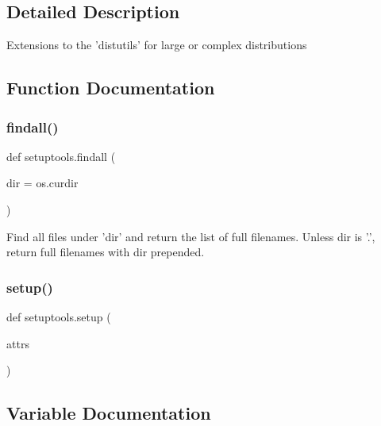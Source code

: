 \subsection{Detailed Description}
\begin{DoxyVerb}Extensions to the 'distutils' for large or complex distributions\end{DoxyVerb}
 

\subsection{Function Documentation}
\mbox{\label{namespacesetuptools_a9d3e6b5f82f1d22fb1d7ad0daf6018f6}} 
\subsubsection{\texorpdfstring{findall()}{findall()}}
{\footnotesize\ttfamily def setuptools.\+findall (\begin{DoxyParamCaption}\item[{}]{dir = {\ttfamily os.curdir} }\end{DoxyParamCaption})}

\begin{DoxyVerb}Find all files under 'dir' and return the list of full filenames.
Unless dir is '.', return full filenames with dir prepended.
\end{DoxyVerb}
 \mbox{\label{namespacesetuptools_ad048bb82cb20bf61541da45950f1f4cb}} 
\subsubsection{\texorpdfstring{setup()}{setup()}}
{\footnotesize\ttfamily def setuptools.\+setup (\begin{DoxyParamCaption}\item[{}]{attrs }\end{DoxyParamCaption})}



\subsection{Variable Documentation}
\mbox{\label{namespacesetuptools_a7d51d85e64a02e0808685340753eec38}} 
